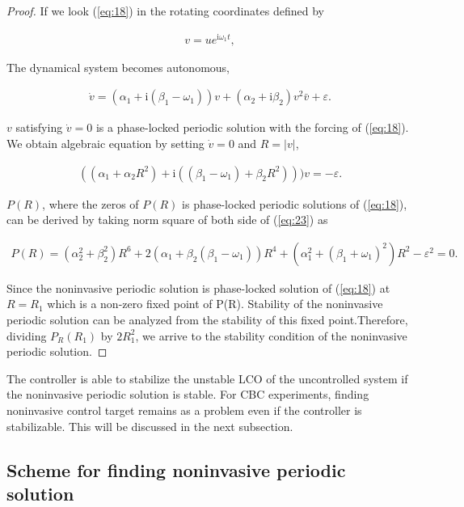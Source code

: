 \documentclass[openacc]{rsproca_new}%
\def\epsilon{\varepsilon}
\newcommand{\Eref}[1]{(\ref{#1})}
\begin{document}
\begin{proof}
If we look \Eref{eq:18} in the rotating coordinates defined by

\begin{align}\label{eq:21}
  v=ue^{\textrm{i}\omega_1 t},
\end{align}

\noindent The dynamical system becomes autonomous,

\begin{align}\label{eq:22}
  \dot v=(\alpha_1+\textrm{i}(\beta_1-\omega_1))v+(\alpha_2+\textrm{i}\beta_2)v^2\bar{v}+\epsilon.
\end{align}

\noindent $v$ satisfying $\dot v=0$ is a phase-locked periodic solution with the forcing of \Eref{eq:18}. We obtain algebraic equation by setting $\dot v=0$ and $R=|v|$,

\begin{align}\label{eq:23}
  ((\alpha_1+\alpha_2R^2)+\textrm{i}((\beta_1-\omega_1)+\beta_2 R^2)))v=-\epsilon.
\end{align}

\noindent $P(R)$, where the zeros of $P(R)$ is phase-locked periodic solutions of \Eref{eq:18}, can be derived by taking norm square of both side of \Eref{eq:23} as

\begin{align}\label{eq:24}
  P(R)=(\alpha_2^2+\beta_2^2)R^6+2(\alpha_1+\beta_2(\beta_1-\omega_1))R^4+(\alpha_1^2+(\beta_1+\omega_1)^2)R^2-\epsilon^2=0.
\end{align}

\noindent Since the noninvasive periodic solution is phase-locked solution of \Eref{eq:18} at $R=R_1$ which is a non-zero fixed point of P(R). Stability of the noninvasive periodic solution can be analyzed from the stability of this fixed point.Therefore, dividing $P_R(R_1)$ by $2R_1^2$, we arrive to the stability condition of the noninvasive periodic solution.
\end{proof}

\noindent The controller is able to stabilize the unstable LCO of the uncontrolled system if the noninvasive periodic solution is stable. For CBC experiments, finding noninvasive control target remains as a problem even if the controller is stabilizable. This will be discussed in the next subsection.

\subsection{Scheme for finding noninvasive periodic solution}\label{FNP}
\end{document}
